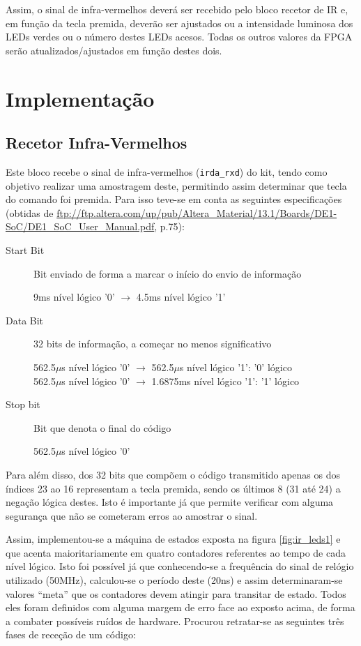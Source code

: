 \documentclass[a4paper,11pt,openright,oneside]{report}
\begin{document}
Assim, o sinal de infra-vermelhos deverá ser recebido pelo bloco recetor de IR e, em função da tecla premida, deverão ser ajustados ou a intensidade luminosa dos LEDs verdes ou o número destes LEDs acesos. Todas os outros valores da FPGA serão atualizados/ajustados em função destes dois.

\section{Implementação}
\label{sec:implementação}

\subsection*{Recetor Infra-Vermelhos}

Este bloco recebe o sinal de infra-vermelhos (\verb|irda_rxd|) do kit, tendo como objetivo realizar uma amostragem deste, permitindo assim determinar que tecla do comando foi premida. Para isso teve-se em conta as seguintes especificações (obtidas de \url{ftp://ftp.altera.com/up/pub/Altera_Material/13.1/Boards/DE1-SoC/DE1_SoC_User_Manual.pdf}, p.75):
\begin{description}
\item[Start Bit] Bit enviado de forma a marcar o início do envio de informação

9ms nível lógico '0' $\rightarrow$ 4.5ms nível lógico '1'
\item[Data Bit] 32 bits de informação, a começar no menos significativo

562.5$\mu$s nível lógico '0' $\rightarrow$ 562.5$\mu$s nível lógico '1': '0' lógico\\
562.5$\mu$s nível lógico '0' $\rightarrow$ 1.6875ms nível lógico '1': '1' lógico

\item[Stop bit] Bit que denota o final do código

562.5$\mu$s nível lógico '0'
\end{description}

Para além disso, dos 32 bits que compõem o código transmitido apenas os dos índices 23 ao 16 representam a tecla premida, sendo os últimos 8 (31 até 24) a negação lógica destes. Isto é importante já que permite verificar com alguma segurança que não se cometeram erros ao amostrar o sinal.

Assim, implementou-se a máquina de estados exposta na figura \ref{fig:ir_leds1} e que acenta maioritariamente em quatro contadores referentes ao tempo de cada nível lógico. Isto foi possível já que conhecendo-se a frequência do sinal de relógio utilizado (50MHz), calculou-se o período deste (20ns) e assim determinaram-se valores ``meta'' que os contadores devem atingir para transitar de estado. Todos eles foram definidos com alguma margem de erro face ao exposto acima, de forma a combater possíveis ruídos de hardware. Procurou retratar-se as seguintes três fases de receção de um código:
\end{document}
